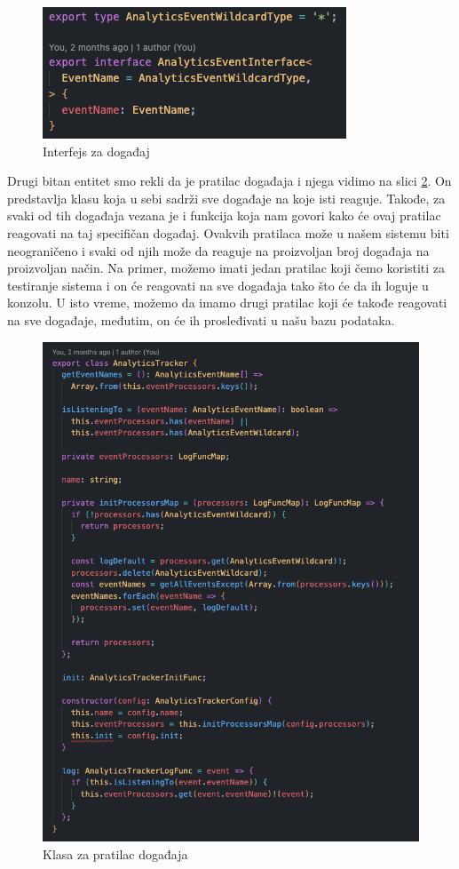 \documentclass[12pt,oneside]{memoir}
\begin{document}
\begin{figure}[h!]
\centering
\includegraphics[scale=0.5]{docs/images/chapterSix/eventInterface.png}
\caption{Interfejs za događaj}
\label{fig:eventInterface}
\end{figure}

Drugi bitan entitet smo rekli da je pratilac događaja i njega vidimo na slici \ref{fig:analyticsTracker}. On predstavlja klasu koja u sebi sadrži sve događaje na koje isti reaguje. Takođe, za svaki od tih događaja vezana je i funkcija koja nam govori kako će ovaj pratilac reagovati na taj specifičan događaj. Ovakvih pratilaca može u našem sistemu biti neograničeno i svaki od njih može da reaguje na proizvoljan broj događaja na proizvoljan način. Na primer, možemo imati jedan pratilac koji čemo koristiti za testiranje sistema i on će reagovati na sve događaja tako što će da ih loguje u konzolu. U isto vreme, možemo da imamo drugi pratilac koji će takođe reagovati na sve događaje, međutim, on će ih prosleđivati u našu bazu podataka.

\begin{figure}[h!]
\centering
\includegraphics[scale=0.5]{docs/images/chapterSix/analyticsTracker.png}
\caption{Klasa za pratilac događaja}
\label{fig:analyticsTracker}
\end{figure}
\end{document}
